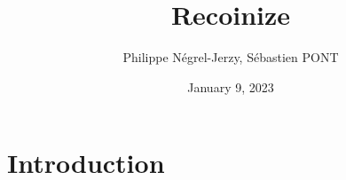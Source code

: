 \documentclass{sebaClass}
\title{Recoinize}
\author{Philippe Négrel-Jerzy, Sébastien PONT}
\date{January 9, 2023}
\begin{document}
\maketitle
\tableofcontents

\newpage

\section{Introduction}
% 
\end{document}
